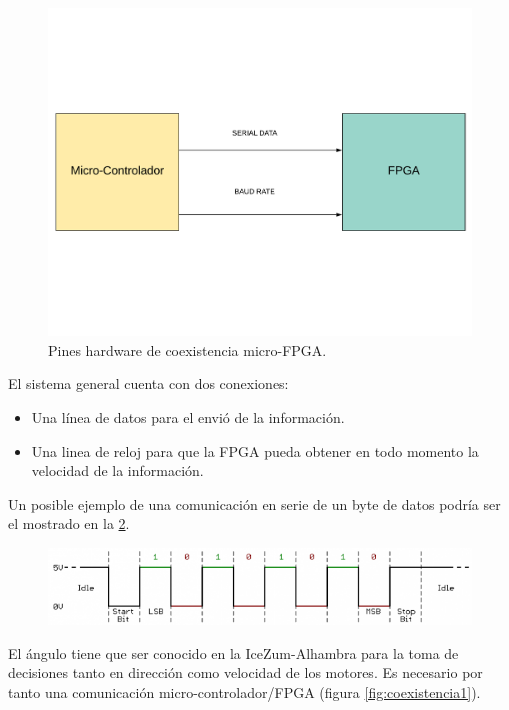 \begin{figure}[H]
	\center
	\includegraphics[trim = 0mm 40mm 0mm 20mm, clip,scale=0.4]{imagenes/Balancing_robot/coexistencia2.pdf}
	\caption{Pines hardware de coexistencia micro-FPGA.}
	\label{fig:coexistencia2}
\end{figure}
El sistema general cuenta con dos conexiones:
\begin{itemize}
	\item Una línea de datos para el envió de la información.
	\item Una linea de reloj para que la FPGA pueda obtener en todo momento la velocidad de la información.
\end{itemize}

Un posible ejemplo de una comunicación en serie de un byte de datos podría ser el mostrado en la \ref{fig:serial_comunicattion}. 

\begin{center}
	\begin{figure}[H]
		\center
		\includegraphics[scale=0.8, angle=0]{imagenes/Balancing_Robot/serial_comunicattion.png}
		\caption{}
		\label{fig:serial_comunicattion}
	\end{figure}
\end{center}

El ángulo tiene que ser conocido en la IceZum-Alhambra para la toma de decisiones tanto en dirección como velocidad de los motores. Es necesario por tanto una comunicación micro-controlador/FPGA (figura \ref{fig:coexistencia1}).

